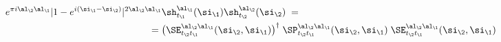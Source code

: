 \begin{equation}\begin{aligned}
e^{\pi i \al_\2\al_\1}
|1-e^{i(\si_\1-\si_\2)}|^{2\al_\2\al_\1} & 
\sh_{t_\1}^{\al_\1}(\si_\1)\sh_{t_\2}^{\al_\2}(\si_\2)
\;=\;\\
=\;& \big(\SE^{\al_\2\al_\1}_{t_\2t_\1}(\si_\2,\si_\1)\big)^{\dagger}\;
\SP^{\al_\2\al_\1}_{t_\2t_\1}(\si_\2,\si_\1)\;
\SE^{\al_\2\al_\1}_{t_\2t_\1}(\si_\2,\si_\1)
\end{aligned}%
\end{equation} 
